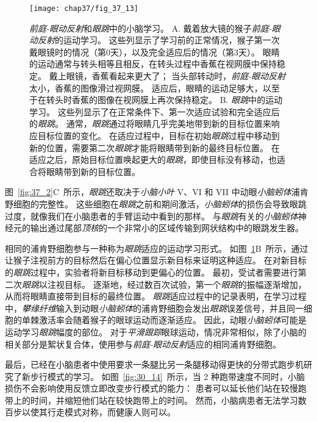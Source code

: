 \begin{figure}[htbp]
	\centering
	\texttt{[image: chap37/fig\_37\_13]}
	\caption{\textit{前庭-眼动反射}和\textit{眼跳}中的小脑学习。
		A. 戴着放大镜的猴子\textit{前庭-眼动反射}的运动学习。
		这些列显示了学习前的正常情况，猴子第一次戴眼镜时的情况（第0天），以及完全适应后的情况（第3天）。
		眼睛的运动通常与转头相等且相反，在转头过程中香蕉在视网膜中保持稳定。
		戴上眼镜，香蕉看起来更大了；
		当头部转动时，\textit{前庭-眼动反射}太小，香蕉的图像滑过视网膜。
		适应后，眼睛的运动足够大，以至于在转头时香蕉的图像在视网膜上再次保持稳定\cite{lisberger1988neural}。
		B. \textit{眼跳}中的运动学习。
		这些列显示了在正常条件下、第一次适应试验和完全适应后的\textit{眼跳}。
		通常，\textit{眼跳}通过将眼睛几乎完美地带到新的目标位置来响应目标位置的变化。
		在适应过程中，目标在初始\textit{眼跳}过程中移动到新的位置，需要第二次\textit{眼跳}才能将眼睛带到新的最终目标位置。
		在适应之后，原始目标位置唤起更大的\textit{眼跳}，即使目标没有移动，也适合将眼睛带到新的目标位置。}
	\label{fig:37_13}
\end{figure}


图~\ref{fig:37_2}C~所示，\textit{眼跳}还取决于\textit{小脑小叶} V、VI 和 VII 中动眼\textit{小脑蚓体}浦肯野细胞的完整性。
这些细胞在\textit{眼跳}之前和期间激活，\textit{小脑蚓体}的损伤会导致眼跳过度，就像我们在小脑患者的手臂运动中看到的那样。
与\textit{眼跳}有关的\textit{小脑蚓体}神经元的输出通过尾部\textit{顶核}的一个非常小的区域传输到网状结构中的眼跳发生器。


相同的浦肯野细胞参与一种称为\textit{眼跳}适应的运动学习形式。
如图~\ref{fig:37_13}B~所示，通过让猴子注视前方的目标然后在偏心位置显示新目标来证明这种适应。
在对新目标的\textit{眼跳}过程中，实验者将新目标移动到更偏心的位置。
最初，受试者需要进行第二次\textit{眼跳}以注视目标。
逐渐地，经过数百次试验，第一个\textit{眼跳}的振幅逐渐增加，从而将眼睛直接带到目标的最终位置。
\textit{眼跳}适应过程中的记录表明，在学习过程中，\textit{攀缘纤维}输入到动眼\textit{小脑蚓体}的浦肯野细胞会发出\textit{眼跳}误差信号，并且同一细胞的单棘激活率会随着猴子的眼球运动而逐渐适应。
因此，动眼\textit{小脑蚓体}可能是运动学习\textit{眼跳}幅度的部位。
对于\textit{平滑跟踪}眼球运动，情况非常相似，除了小脑的相关部分是絮状复合体，使用参与\textit{前庭-眼动反射}适应的相同浦肯野细胞。


最后，已经在小脑患者中使用要求一条腿比另一条腿移动得更快的分带式跑步机研究了新步行模式的学习。
如图~\ref{fig:30_14}~所示，当 2 种跑带速度不同时，小脑损伤不会影响使用反馈立即改变步行模式的能力：
患者可以延长他们站在较慢跑带上的时间，并缩短他们站在较快跑带上的时间。
然而，小脑病患者无法学习数百步以使其行走模式对称，而健康人则可以。



